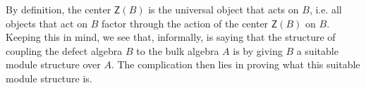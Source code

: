 \documentclass[../text]{subfiles}
\begin{document}
\begin{remark}
    By definition, the center $\mathsf{Z}(B)$ is the universal object that acts on $B$, i.e. all objects that act on $B$ factor through the action of the center $\mathsf{Z}(B)$ on $B$. Keeping this in mind, we see that, informally,  is saying that the structure of coupling the defect algebra $B$ to the bulk algebra $A$ is by giving $B$ a suitable module structure over $A$. The complication then lies in proving what this suitable module structure is. 
\end{remark}
\end{document}
